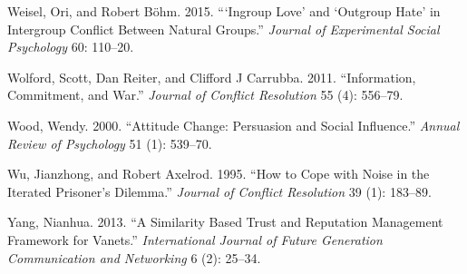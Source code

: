 \documentclass[11pt]{article}
\begin{document}
\leavevmode\hypertarget{ref-weisel2015ingroup}{}%
Weisel, Ori, and Robert Böhm. 2015. ```Ingroup Love' and `Outgroup Hate'
in Intergroup Conflict Between Natural Groups.'' \emph{Journal of
Experimental Social Psychology} 60: 110--20.

\leavevmode\hypertarget{ref-wolford2011information}{}%
Wolford, Scott, Dan Reiter, and Clifford J Carrubba. 2011.
``Information, Commitment, and War.'' \emph{Journal of Conflict
Resolution} 55 (4): 556--79.

\leavevmode\hypertarget{ref-wood2000attitude}{}%
Wood, Wendy. 2000. ``Attitude Change: Persuasion and Social Influence.''
\emph{Annual Review of Psychology} 51 (1): 539--70.

\leavevmode\hypertarget{ref-wu1995cope}{}%
Wu, Jianzhong, and Robert Axelrod. 1995. ``How to Cope with Noise in the
Iterated Prisoner's Dilemma.'' \emph{Journal of Conflict Resolution} 39
(1): 183--89.

\leavevmode\hypertarget{ref-yang2013similarity}{}%
Yang, Nianhua. 2013. ``A Similarity Based Trust and Reputation
Management Framework for Vanets.'' \emph{International Journal of Future
Generation Communication and Networking} 6 (2): 25--34.
\end{document}
